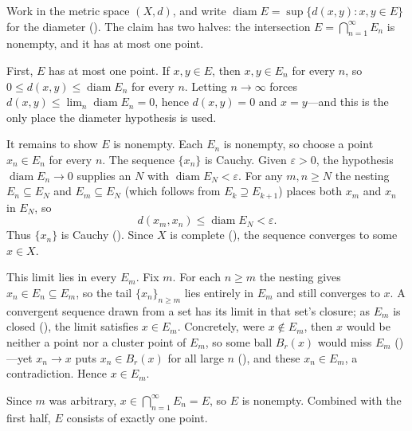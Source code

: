 \documentclass[main.tex]{subfiles}
\begin{document}
\begin{SolutionBlue}
Work in the metric space $(X,d)$, and write $\operatorname{diam} E=\sup\{d(x,y):x,y\in E\}$ for the
diameter (). The claim has two halves: the intersection $E=\bigcap_{n=1}^{\infty}E_n$ is
nonempty, and it has at most one point.

First, $E$ has at most one point. If $x,y\in E$, then $x,y\in E_n$ for every $n$, so $0\le d(x,y)\le
\operatorname{diam} E_n$ for every $n$. Letting $n\to\infty$ forces $d(x,y)\le\lim_n\operatorname{diam}
E_n=0$, hence $d(x,y)=0$ and $x=y$---and this is the only place the diameter hypothesis is used.

It remains to show $E$ is nonempty. Each $E_n$ is nonempty, so choose a point $x_n\in E_n$ for every
$n$. The sequence $\{x_n\}$ is Cauchy. Given $\varepsilon>0$, the hypothesis $\operatorname{diam}
E_n\to 0$ supplies an
$N$ with $\operatorname{diam} E_N<\varepsilon$. For any $m,n\ge N$ the nesting $E_n\subseteq E_N$ and
$E_m\subseteq E_N$ (which follows from $E_{k}\supseteq E_{k+1}$) places both $x_m$ and $x_n$ in $E_N$,
so
\[
d(x_m,x_n)\le\operatorname{diam} E_N<\varepsilon.
\]
Thus $\{x_n\}$ is Cauchy (). Since $X$ is complete (), the sequence converges
to some $x\in X$.

This limit lies in every $E_m$. Fix $m$. For each $n\ge m$ the nesting gives $x_n\in E_n\subseteq
E_m$, so the tail $\{x_n\}_{n\ge m}$ lies entirely in $E_m$ and still converges to $x$. A convergent
sequence drawn from a set has its limit in that set's closure; as $E_m$ is closed (), the
limit satisfies $x\in E_m$. Concretely, were $x\notin E_m$, then $x$ would be neither a point nor a
cluster point of $E_m$, so some ball $B_r(x)$ would miss $E_m$ ()---yet $x_n\to x$ puts
$x_n\in B_r(x)$ for all large $n$ (), and these $x_n\in E_m$, a contradiction. Hence $x\in E_m$.

Since $m$ was arbitrary, $x\in\bigcap_{n=1}^{\infty}E_n=E$, so $E$ is nonempty. Combined with the first
half, $E$ consists of exactly one point.
\end{SolutionBlue}
\end{document}
